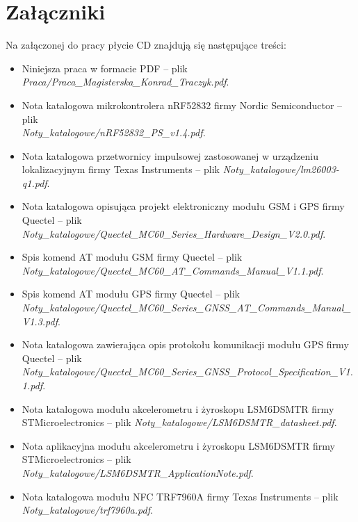\appendix
\chapter*{Załączniki}

Na załączonej do pracy płycie CD znajdują się następujące treści:
\begin{itemize}
 \item Niniejsza praca w formacie PDF -- plik\\ \textit{Praca/Praca\_Magisterska\_Konrad\_Traczyk.pdf}.
 
 \item Nota katalogowa mikrokontrolera nRF52832 firmy Nordic Semiconductor -- plik\\ \textit{Noty\_katalogowe/nRF52832\_PS\_v1.4.pdf.}
 
 \item Nota katalogowa przetwornicy impulsowej zastosowanej w urządzeniu lokalizacyjnym firmy Texas Instruments -- plik \textit{Noty\_katalogowe/lm26003-q1.pdf}.
 
 \item Nota katalogowa opisująca projekt elektroniczny modułu GSM i GPS firmy Quectel -- plik \textit{Noty\_katalogowe/Quectel\_MC60\_Series\_Hardware\_Design\_V2.0.pdf}.
 
 \item Spis komend AT modułu GSM firmy Quectel -- plik\\ \textit{Noty\_katalogowe/Quectel\_MC60\_AT\_Commands\_Manual\_V1.1.pdf}.
 
 \item Spis komend AT modułu GPS firmy Quectel -- plik\\ \textit{Noty\_katalogowe/Quectel\_MC60\_Series\_GNSS\_AT\_Commands\_Manual\_V1.3.pdf}.
 
 \item Nota katalogowa zawierająca opis protokołu komunikacji modułu GPS firmy Quectel -- plik \textit{Noty\_katalogowe/Quectel\_MC60\_Series\_GNSS\_Protocol\_Specification\_V1.1.pdf}.
  
 \item Nota katalogowa modułu akcelerometru i żyroskopu LSM6DSMTR firmy STMicroelectronics -- plik \textit{Noty\_katalogowe/LSM6DSMTR\_datasheet.pdf}.

  \item Nota aplikacyjna modułu akcelerometru i żyroskopu LSM6DSMTR firmy STMicroelectronics -- plik \textit{Noty\_katalogowe/LSM6DSMTR\_ApplicationNote.pdf}.
 
  \item Nota katalogowa modułu NFC TRF7960A firmy Texas Instruments -- plik\\ \textit{Noty\_katalogowe/trf7960a.pdf}.
  

\end{itemize}
